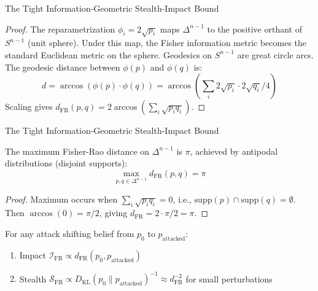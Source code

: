\documentclass[
  ignorenonframetext,
]{beamer}
\begin{document}
\begin{frame}[allowframebreaks]{The Tight Information-Geometric
Stealth-Impact Bound}
\begin{proof}
The reparametrization $\phi_i = 2\sqrt{p_i}$ maps $\Delta^{n-1}$ to the positive orthant of $S^{n-1}$ (unit sphere). Under this map, the Fisher information metric becomes the standard Euclidean metric on the sphere. Geodesics on $S^{n-1}$ are great circle arcs. The geodesic distance between $\phi(p)$ and $\phi(q)$ is:
\begin{equation}
\label{eq:fr-proof-1}
d = \arccos(\phi(p) \cdot \phi(q)) = \arccos\!\left(\sum_i 2\sqrt{p_i} \cdot 2\sqrt{q_i} / 4\right)
\end{equation}
Scaling gives $d_{\mathrm{FR}}(p, q) = 2\arccos(\sum_i \sqrt{p_i q_i})$.
\end{proof}

\end{frame}

\begin{frame}[allowframebreaks]{The Tight Information-Geometric
Stealth-Impact Bound}
\begin{lemma}
\label{lem:simplex-diameter}
The maximum Fisher-Rao distance on $\Delta^{n-1}$ is $\pi$, achieved by antipodal distributions (disjoint supports):
\begin{equation}
\label{eq:diameter-bound}
\max_{p, q \in \Delta^{n-1}} d_{\mathrm{FR}}(p, q) = \pi
\end{equation}
\end{lemma}

\begin{proof}
Maximum occurs when $\sum_i \sqrt{p_i q_i} = 0$, i.e., $\text{supp}(p) \cap \text{supp}(q) = \emptyset$. Then $\arccos(0) = \pi/2$, giving $d_{\mathrm{FR}} = 2 \cdot \pi/2 = \pi$.
\end{proof}

\begin{lemma}
\label{lem:impact-stealth-inverse}
For any attack shifting belief from $p_0$ to $p_{\text{attacked}}$:
\begin{enumerate}
\item Impact $\mathcal{I}_{\mathrm{FR}} \propto d_{\mathrm{FR}}(p_0, p_{\text{attacked}})$
\item Stealth $\mathcal{S}_{\mathrm{FR}} \propto D_{\mathrm{KL}}(p_0 \| p_{\text{attacked}})^{-1} \approx d_{\mathrm{FR}}^{-2}$ for small perturbations
\end{enumerate}
\end{lemma}

\end{frame}
\end{document}
